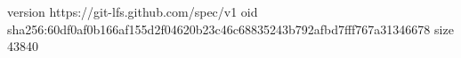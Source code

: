 version https://git-lfs.github.com/spec/v1
oid sha256:60df0af0b166af155d2f04620b23c46c68835243b792afbd7fff767a31346678
size 43840
